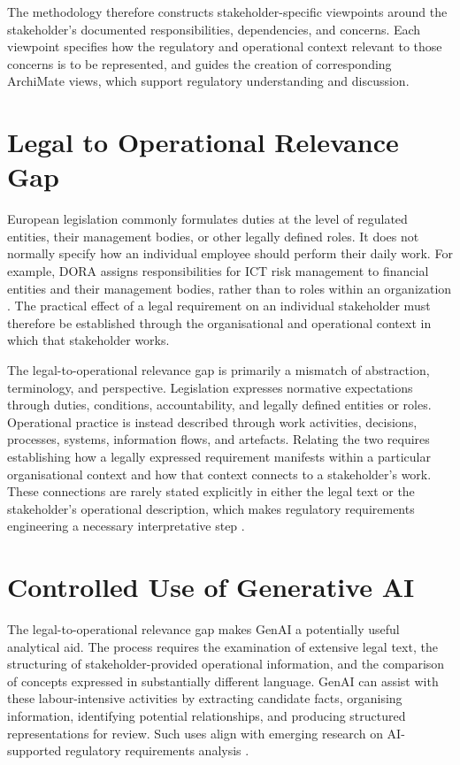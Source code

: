 The methodology therefore constructs stakeholder-specific viewpoints around the stakeholder's documented responsibilities, dependencies, and concerns. Each viewpoint specifies how the regulatory and operational context relevant to those concerns is to be represented, and guides the creation of corresponding ArchiMate views, which support regulatory understanding and discussion.

\section{Legal to Operational Relevance Gap}

European legislation commonly formulates duties at the level of regulated entities, their management bodies, or other legally defined roles. It does not normally specify how an individual employee should perform their daily work. For example, \ac{DORA} assigns responsibilities for \ac{ICT} risk management to financial entities and their management bodies, rather than to roles within an organization \cite{DORA}. The practical effect of a legal requirement on an individual stakeholder must therefore be established through the organisational and operational context in which that stakeholder works.

The legal-to-operational relevance gap is primarily a mismatch of abstraction, terminology, and perspective. Legislation expresses normative expectations through duties, conditions, accountability, and legally defined entities or roles. Operational practice is instead described through work activities, decisions, processes, systems, information flows, and artefacts. Relating the two requires establishing how a legally expressed requirement manifests within a particular organisational context and how that context connects to a stakeholder's work. These connections are rarely stated explicitly in either the legal text or the stakeholder's operational description, which makes regulatory requirements engineering a necessary interpretative step \cite{Ghanavati2014}.

\section{Controlled Use of Generative AI}

The legal-to-operational relevance gap makes \ac{GenAI} a potentially useful analytical aid. The process requires the examination of extensive legal text, the structuring of stakeholder-provided operational information, and the comparison of concepts expressed in substantially different language. \ac{GenAI} can assist with these labour-intensive activities by extracting candidate facts, organising information, identifying potential relationships, and producing structured representations for review. Such uses align with emerging research on AI-supported regulatory requirements analysis \cite{Abualhaija2024}.

